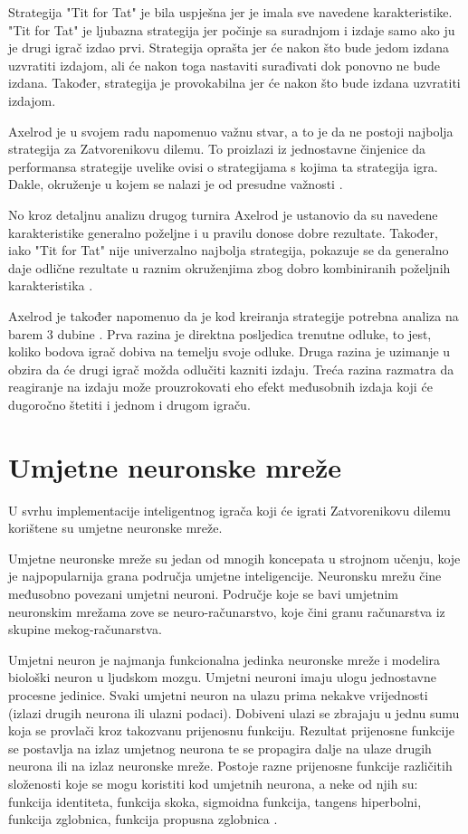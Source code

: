 \documentclass[zavrsnirad]{fer}
\begin{document}
		Strategija "Tit for Tat" je bila uspješna jer je imala sve navedene karakteristike. "Tit for Tat" je ljubazna strategija jer počinje sa suradnjom i izdaje samo ako ju je drugi igrač izdao prvi. Strategija oprašta jer će nakon što bude jedom izdana uzvratiti izdajom, ali će nakon toga nastaviti surađivati dok ponovno ne bude izdana. Također, strategija je provokabilna jer će nakon što bude izdana uzvratiti izdajom.
	
		Axelrod je u svojem radu napomenuo važnu stvar, a to je da ne postoji najbolja strategija za Zatvorenikovu dilemu. To proizlazi iz jednostavne činjenice da performansa strategije uvelike ovisi o strategijama s kojima ta strategija igra. Dakle, okruženje u kojem se nalazi je od presudne važnosti \cite{1980Axelrod1}.
	
		No kroz detaljnu analizu drugog turnira Axelrod je ustanovio da su navedene karakteristike generalno poželjne i u pravilu donose dobre rezultate. Također, iako "Tit for Tat" nije univerzalno najbolja strategija, pokazuje se da generalno daje odlične rezultate u raznim okruženjima zbog dobro kombiniranih poželjnih karakteristika \cite{1980Axelrod2}.
	
		Axelrod je također napomenuo da je kod kreiranja strategije potrebna analiza na barem 3 dubine \cite{1980Axelrod1}. Prva razina je direktna posljedica trenutne odluke, to jest, koliko bodova igrač dobiva na temelju svoje odluke. Druga razina je uzimanje u obzira da će drugi igrač možda odlučiti kazniti izdaju. Treća razina razmatra da reagiranje na izdaju može prouzrokovati eho efekt međusobnih izdaja koji će dugoročno štetiti i jednom i drugom igraču.

\chapter{Umjetne neuronske mreže}

	U svrhu implementacije inteligentnog igrača koji će igrati Zatvorenikovu dilemu korištene su umjetne neuronske mreže.
	
	Umjetne neuronske mreže su jedan od mnogih koncepata u strojnom učenju, koje je najpopularnija grana područja umjetne inteligencije. Neuronsku mrežu čine međusobno povezani umjetni neuroni. Područje koje se bavi umjetnim neuronskim mrežama zove se neuro-računarstvo, koje čini granu računarstva iz skupine mekog-računarstva. \cite{skriptaNeuronskeMreze} 
	
	Umjetni neuron je najmanja funkcionalna jedinka neuronske mreže i modelira biološki neuron u ljudskom mozgu. Umjetni neuroni imaju ulogu jednostavne procesne jedinice. Svaki umjetni neuron na ulazu prima nekakve vrijednosti (izlazi drugih neurona ili ulazni podaci). Dobiveni ulazi se zbrajaju u jednu sumu koja se provlači kroz takozvanu prijenosnu funkciju. Rezultat prijenosne funkcije se postavlja na izlaz umjetnog neurona te se propagira dalje na ulaze drugih neurona ili na izlaz neuronske mreže. Postoje razne prijenosne funkcije različitih složenosti koje se mogu koristiti kod umjetnih neurona, a neke od njih su: funkcija identiteta, funkcija skoka, sigmoidna funkcija, tangens hiperbolni, funkcija zglobnica, funkcija propusna zglobnica \cite{skriptaNeuronskeMreze}.
\end{document}
